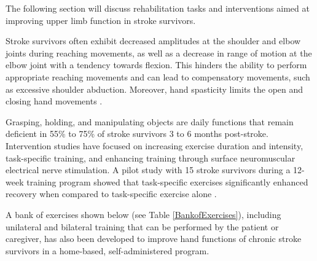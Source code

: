 The following section will discuss rehabilitation tasks and interventions aimed at improving upper limb function in stroke survivors.

Stroke survivors often exhibit decreased amplitudes at the shoulder and elbow joints during reaching movements, as well as a decrease in range of motion at the elbow joint with a tendency towards flexion. This hinders the ability to perform appropriate reaching movements and can lead to compensatory movements, such as excessive shoulder abduction. Moreover, hand spasticity limits the open and closing hand movements \cite{Kantak2017}.

Grasping, holding, and manipulating objects are daily functions that remain deficient in 55\% to 75\% of stroke survivors 3 to 6 months post-stroke. Intervention studies have focused on increasing exercise duration and intensity, task-specific training, and enhancing training through surface neuromuscular electrical nerve stimulation. A pilot study with 15 stroke survivors during a 12-week training program showed that task-specific exercises significantly enhanced recovery when compared to task-specific exercise alone \cite{Alon2007}.

A bank of exercises shown below (see Table \ref{BankofExercises}), including unilateral and bilateral training that can be performed by the patient or caregiver, has also been developed to improve hand functions of chronic stroke survivors in a home-based, self-administered program. 

